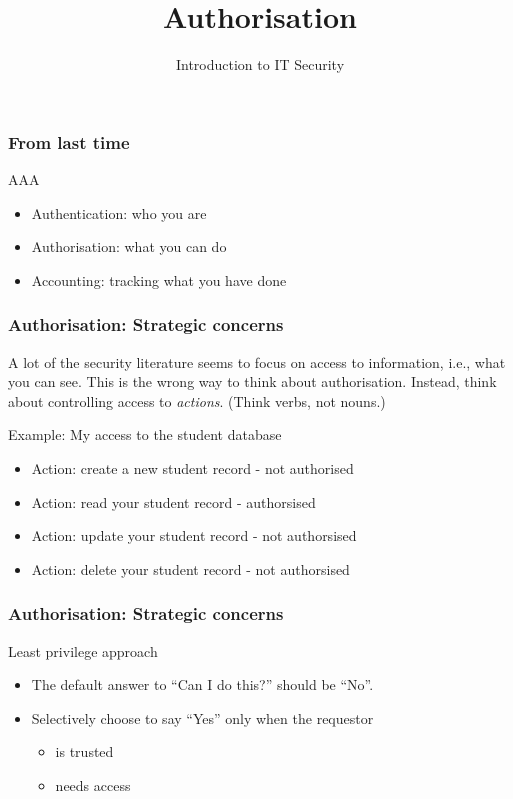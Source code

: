 \documentclass[10pt]{beamer}
\title{Authorisation}
\author[IN618]{Introduction to IT Security}
\institute[Otago Polytechnic]{
  Otago Polytechnic \\
  Dunedin, New Zealand \\
}
\date{}
\begin{document}
\begin{frame}[plain]
  \titlepage
\end{frame}


\begin{frame}
  \frametitle{From last time}

 AAA

 \begin{itemize}
	 \item Authentication: who you are 
	 \item Authorisation: what you can do
	 \item Accounting: tracking what you have done
 \end{itemize}
\end{frame}



\begin{frame}
	\frametitle{Authorisation: Strategic concerns}

 A lot of the security literature seems to focus on access to information, i.e., what you can see.
 This is the wrong way to think about authorisation.  Instead, think about controlling access to 
 \emph{actions}. (Think verbs, not nouns.)

 Example:  My access to the student database
 \begin{itemize}
  \item Action:  create a new student record - not authorised		 
  \item Action:  read your student record - authorsised
  \item Action:  update  your student record - not authorsised
  \item Action:  delete your student record - not authorsised
  \end{itemize}
\end{frame}


\begin{frame}
  \frametitle{Authorisation: Strategic concerns}

 Least privilege approach
 \begin{itemize}
  \item The default answer to ``Can I do this?'' should be ``No''.
  \item Selectively choose to say ``Yes'' only when the requestor 
	  \begin{itemize}
		  \item is trusted
		  \item needs access
	  \end{itemize}

					  
  \end{itemize}
\end{frame}
\end{document}
